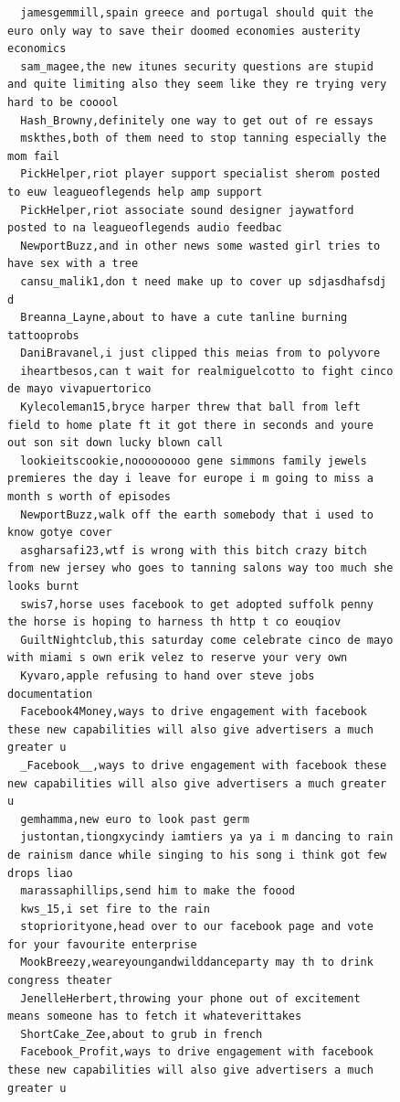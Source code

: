 \begin{figure}[htpb]
\begin{verbatim}
  jamesgemmill,spain greece and portugal should quit the euro only way to save their doomed economies austerity economics
  sam_magee,the new itunes security questions are stupid and quite limiting also they seem like they re trying very hard to be cooool
  Hash_Browny,definitely one way to get out of re essays
  mskthes,both of them need to stop tanning especially the mom fail
  PickHelper,riot player support specialist sherom posted to euw leagueoflegends help amp support
  PickHelper,riot associate sound designer jaywatford posted to na leagueoflegends audio feedbac
  NewportBuzz,and in other news some wasted girl tries to have sex with a tree
  cansu_malik1,don t need make up to cover up sdjasdhafsdj d
  Breanna_Layne,about to have a cute tanline burning tattooprobs
  DaniBravanel,i just clipped this meias from to polyvore
  iheartbesos,can t wait for realmiguelcotto to fight cinco de mayo vivapuertorico
  Kylecoleman15,bryce harper threw that ball from left field to home plate ft it got there in seconds and youre out son sit down lucky blown call
  lookieitscookie,nooooooooo gene simmons family jewels premieres the day i leave for europe i m going to miss a month s worth of episodes
  NewportBuzz,walk off the earth somebody that i used to know gotye cover
  asgharsafi23,wtf is wrong with this bitch crazy bitch from new jersey who goes to tanning salons way too much she looks burnt
  swis7,horse uses facebook to get adopted suffolk penny the horse is hoping to harness th http t co eouqiov
  GuiltNightclub,this saturday come celebrate cinco de mayo with miami s own erik velez to reserve your very own
  Kyvaro,apple refusing to hand over steve jobs documentation
  Facebook4Money,ways to drive engagement with facebook these new capabilities will also give advertisers a much greater u
  _Facebook__,ways to drive engagement with facebook these new capabilities will also give advertisers a much greater u
  gemhamma,new euro to look past germ
  justontan,tiongxycindy iamtiers ya ya i m dancing to rain de rainism dance while singing to his song i think got few drops liao
  marassaphillips,send him to make the foood
  kws_15,i set fire to the rain
  stopriorityone,head over to our facebook page and vote for your favourite enterprise
  MookBreezy,weareyoungandwilddanceparty may th to drink congress theater
  JenelleHerbert,throwing your phone out of excitement means someone has to fetch it whateverittakes
  ShortCake_Zee,about to grub in french
  Facebook_Profit,ways to drive engagement with facebook these new capabilities will also give advertisers a much greater u

\end{verbatim}
\end{figure}
